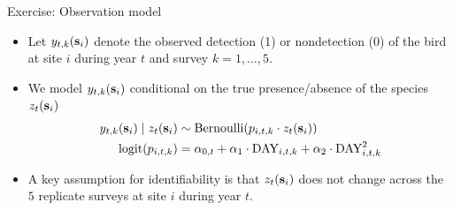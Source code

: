 \begin{frame}{Exercise: Observation model}
	\begin{itemize}
	  \item Let $y_{t, k}(\textbf{s}_i)$ denote the observed detection (1) or nondetection (0) of the bird at site $i$ during year $t$ and survey $k = 1, \dots, 5$. 
	  \item We model $y_{t, k}(\textbf{s}_i)$ conditional on the true presence/absence of the species $z_t(\textbf{s}_i)$
		  \begin{align*}
			  y_{t, k}(\textbf{s}_i) \mid z_t(\textbf{s}_i) &\sim \text{Bernoulli}(p_{i, t, k} \cdot z_t(\textbf{s}_i)) \\
			  \text{logit}(p_{i, t, k}) &= \alpha_{0, t} + \alpha_1 \cdot \text{DAY}_{i, t, k} + \alpha_2 \cdot \text{DAY}^2_{i, t, k}
		  \end{align*}
	  \item A key assumption for identifiability is that $z_t(\textbf{s}_i)$ does not change across the $5$ replicate surveys at site $i$ during year $t$.
	\end{itemize}
\end{frame}



